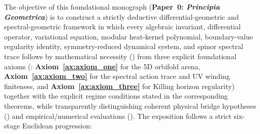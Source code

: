 \documentclass[11pt,a4paper]{article}
\newcommand{\catA}{\text{\textbf{\textcolor{purple!80!black}{[A]}}}}
\newcommand{\catD}{\text{\textbf{\textcolor{blue!75!black}{[D]}}}}
\newcommand{\catH}{\text{\textbf{\textcolor{orange!80!black}{[H]}}}}
\newcommand{\catN}{\text{\textbf{\textcolor{teal!75!black}{[N]}}}}
\theoremstyle{definition}
\theoremstyle{plain}
\theoremstyle{remark}
\begin{document}
The objective of this foundational monograph (\textbf{Paper~0: \textit{Principia Geometrica}}) is to construct a strictly deductive differential-geometric and spectral-geometric framework in which every algebraic invariant, differential operator, variational equation, modular heat-kernel polynomial, boundary-value regularity identity, symmetry-reduced dynamical system, and spinor spectral trace follows by mathematical necessity (\catD) from three explicit foundational axioms (\catA: \textbf{Axiom~\ref{ax:axiom_one}} for the 5D orbifold arena, \textbf{Axiom~\ref{ax:axiom_two}} for the spectral action trace and UV winding finiteness, and \textbf{Axiom~\ref{ax:axiom_three}} for Killing horizon regularity) together with the explicit regime conditions stated in the corresponding theorems, while transparently distinguishing coherent physical bridge hypotheses (\catH) and empirical/numerical evaluations (\catN). The exposition follows a strict six-stage Euclidean progression:
\end{document}
